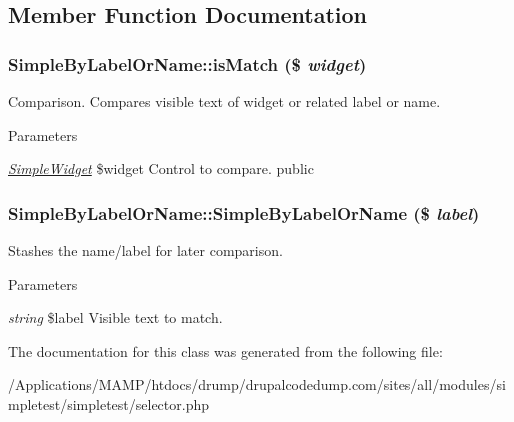 \subsection{Member Function Documentation}
\hypertarget{class_simple_by_label_or_name_abaf2246caac29f2696e464443f91d9a5}{
\subsubsection[{isMatch}]{\setlength{\rightskip}{0pt plus 5cm}SimpleByLabelOrName::isMatch (\$ {\em widget})}}
\label{class_simple_by_label_or_name_abaf2246caac29f2696e464443f91d9a5}
Comparison. Compares visible text of widget or related label or name. 
\begin{DoxyParams}{Parameters}
\item[{\em \hyperlink{class_simple_widget}{SimpleWidget}}]\$widget Control to compare.  public \end{DoxyParams}
\hypertarget{class_simple_by_label_or_name_a3daeb4edee9e486f10ef238cbcf2b25e}{
\subsubsection[{SimpleByLabelOrName}]{\setlength{\rightskip}{0pt plus 5cm}SimpleByLabelOrName::SimpleByLabelOrName (\$ {\em label})}}
\label{class_simple_by_label_or_name_a3daeb4edee9e486f10ef238cbcf2b25e}
Stashes the name/label for later comparison. 
\begin{DoxyParams}{Parameters}
\item[{\em string}]\$label Visible text to match. \end{DoxyParams}


The documentation for this class was generated from the following file:\begin{DoxyCompactItemize}
\item 
/Applications/MAMP/htdocs/drump/drupalcodedump.com/sites/all/modules/simpletest/simpletest/selector.php\end{DoxyCompactItemize}
